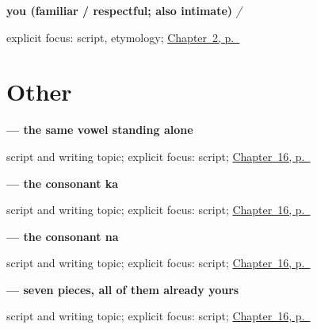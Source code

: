 \noindent\begin{minipage}[t]{\linewidth}
\raggedright
\textbf{you (familiar / respectful; also  intimate)}\enspace\emph{ / }\par
\footnotesize explicit focus: script, etymology; \hyperref[ch:introductions]{Chapter~2, p.~\pageref*{ch:introductions}}
\end{minipage}\par\smallskip

\section*{Other}

\noindent\begin{minipage}[t]{\linewidth}
\raggedright
\textbf{ — the same vowel standing alone}\par
\footnotesize script and writing topic; explicit focus: script; \hyperref[ch:bn-script-first]{Chapter~16, p.~\pageref*{ch:bn-script-first}}
\end{minipage}\par\smallskip

\noindent\begin{minipage}[t]{\linewidth}
\raggedright
\textbf{ — the consonant ka}\par
\footnotesize script and writing topic; explicit focus: script; \hyperref[ch:bn-script-first]{Chapter~16, p.~\pageref*{ch:bn-script-first}}
\end{minipage}\par\smallskip

\noindent\begin{minipage}[t]{\linewidth}
\raggedright
\textbf{ — the consonant na}\par
\footnotesize script and writing topic; explicit focus: script; \hyperref[ch:bn-script-first]{Chapter~16, p.~\pageref*{ch:bn-script-first}}
\end{minipage}\par\smallskip

\noindent\begin{minipage}[t]{\linewidth}
\raggedright
\textbf{ — seven pieces, all of them already yours}\par
\footnotesize script and writing topic; explicit focus: script; \hyperref[ch:bn-script-first]{Chapter~16, p.~\pageref*{ch:bn-script-first}}
\end{minipage}\par\smallskip


